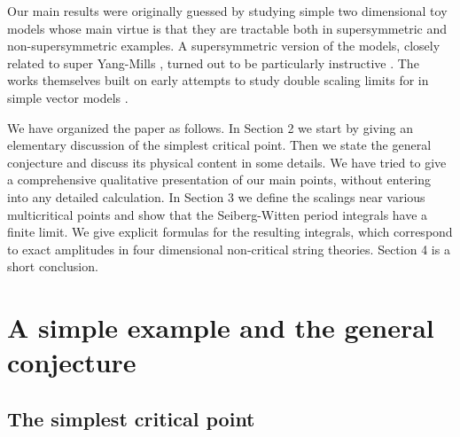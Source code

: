 \documentclass[a4paper,12pt]{article}
\begin{document}
Our main results were originally guessed by
studying simple two dimensional toy models \cite{fer2} whose main virtue
is that they are tractable both in supersymmetric and non-supersymmetric
examples. A supersymmetric version of the models, closely related to
\coordHE{} super Yang-Mills \cite{Dorey}, turned out to be
particularly instructive
\cite{fer3}. The works \cite{fer2,fer3} themselves built on early attempts
to study double scaling limits for \coordHE{} in
simple \coordHE{} vector models \cite{ZJM}.

We have organized the paper as follows. In Section 2 we start by
giving an elementary
discussion of the simplest critical point. Then we state the general
conjecture and discuss its physical content in some details. We have tried
to give a comprehensive qualitative presentation of our main points, 
without entering into any detailed calculation. In Section 3 we 
define the scalings near various multicritical points and show
that the Seiberg-Witten period integrals have a finite limit. 
We give explicit formulas for the resulting integrals,
which correspond to
exact amplitudes in four dimensional non-critical string theories. Section 
4 is a short conclusion.
\vfill\eject

%
\section{A simple example and the general conjecture}
%

%
\subsection{The simplest critical point}
%
\end{document}
